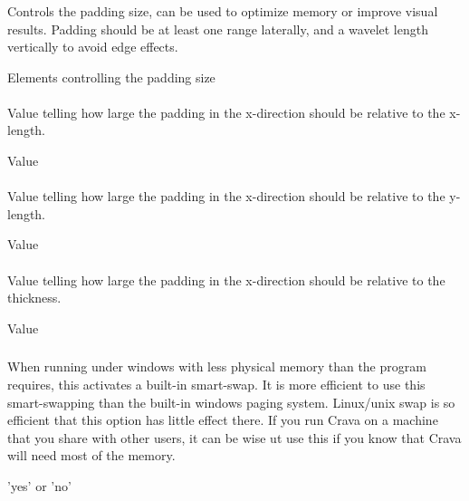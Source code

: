 \subsubsection{}
 \slist
   \item \Description Controls the padding size, can be used to optimize memory or improve visual results. Padding should be at least one range laterally, and a wavelet length vertically to avoid edge effects.
   \item \Argument Elements controlling the padding size
   \item \Default
 \elist

\paragraph{}
 \slist
   \item \Description Value telling how large the padding in the x-direction should be relative to the x-length. %
   \item \Argument Value
   \item {}
 \elist

\paragraph{}
 \slist
   \item \Description Value telling how large the padding in the x-direction should be relative to the y-length.
   \item \Argument Value
   \item {}
 \elist

\paragraph{}
 \slist
   \item \Description Value telling how large the padding in the x-direction should be relative to the thickness.
   \item \Argument Value
   \item {}
 \elist

\subsubsection{} 
 \slist
   \item \Description When running under windows with less physical
     memory than the program requires, this activates a built-in
     smart-swap. It is more efficient to use this smart-swapping than
     the built-in windows paging system. Linux/unix swap is so
     efficient that this option has little effect there. If you run
     Crava on a machine that you share with other users, it can be
     wise ut use this if you know that Crava will need most of the
     memory. 
   \item \Argument 'yes' or 'no'
   \item \Default
 \elist

